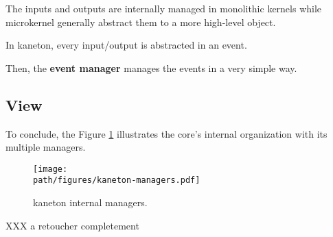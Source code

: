 The inputs and outputs are internally managed in monolithic
kernels while microkernel generally abstract them to a more high-level
object.

In kaneton, every input/output is abstracted in an event.

Then, the \textbf{event manager} manages the events in a very simple way.

%
%

\subsection{View}

To conclude, the Figure \ref{figure:overview_kaneton} illustrates the core's
internal organization with its multiple managers.

\begin{figure}[h]
  \begin{center}
    \texttt{[image: \\path/figures/kaneton-managers.pdf]}
    \caption{kaneton internal managers.}
    \label{figure:overview_kaneton}
  \end{center}
\end{figure}

XXX a retoucher completement
